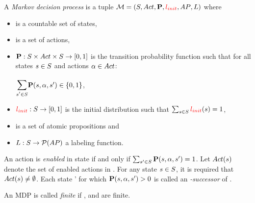 \documentclass[preview]{standalone}
\begin{document}

\begin{definition}
	A \emph{Markov decision process} is a tuple ${\mathcal{M}} = ({S}, {Act}, {\textbf{P}}, {\color{red}{l_{init}}}, {AP}, {L})$ where
	\begin{itemize}
		\item \states is a countable set of states,
		\item \actions is a set of actions,
		\item ${\textbf{P}} : {S} \times {Act} \times {S} \to [0,1]$ is the transition probability function such that for all states ${s} \in {S}$ and actions ${\alpha} \in {Act}$:
		\begin{center}
			$\bbigsum{\state' \in \states}\probtfunc(\state,\action,\state') \in \{0,1\}$,
		\end{center}
	\item ${\color{red}{l_{init}}} : {S} \to [0,1]$ is the initial distribution such that $\sum_{{s} \in {S}} {\color{red}{l_{init}}}({s}) = 1$,
	\item \atomicprops is  a set of atomic propositions and
	\item ${L} : {S} \to {\mathcal{P}(\ensuremath{{AP}})}$ a labeling function.
	\end{itemize}
	An action \action is \emph{enabled} in state \state if and only if $\sum_{{s}' \in {S}} {\textbf{P}}({s},{\alpha},{s}') = 1$. Let ${Act}({s})$ denote the set of enabled actions in \state. For any state ${s} \in {S}$, it is required that ${Act}({s}) \neq \emptyset$. Each state \state' for which ${\textbf{P}}({s},{\alpha},{s}') > 0$ is called an \emph{\action-successor} of \state.
\end{definition}

An MDP is called \emph{finite} if \states, \actions and \atomicprops are finite.
\\

\end{document}
